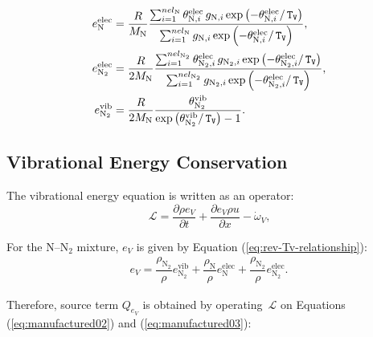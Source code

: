 \documentclass[10pt]{article}
\newcommand{\diff}[2] {\dfrac{\partial #1 }{\partial #2}}
\newcommand{\Lo}{\,\mathcal{L}}
\newcommand{\TV}{\,\mathtt{T_V}}
\newcommand{\N}{\text{N}}
\newcommand{\elec}{\text{elec}}
\newcommand{\vib}{\text{vib}}
\begin{document}
\begin{equation}
\begin{split}\label{eq:aux_02}
e_{\N}^{\elec} &=  \dfrac{R}{M_\N} \dfrac{\sum_{i=1}^{nel_{\N}}  \theta^{\elec}_{\N,i} \, g_{\N,i} \exp\left(- \theta^{\elec}_{\N,i}/ \TV \right)} { \sum_{i=1}^{nel_{\N}} g_{\N,i} \exp\left(-\theta^{\elec}_{\N,i}/\TV\right)},\vspace{5pt}	\\
%
e_{\N_2}^{\elec} &=\dfrac{R}{2 M_\N} \dfrac{\sum_{i=1}^{nel_{\N_2}}  \theta^{\elec}_{\N_2,i} \, g_{\N_2,i} \exp\left(- \theta^{\elec}_{\N_2,i} / \TV \right)} {\sum_{i=1}^{nel_{\N_2}} g_{\N_2,i} \exp\left(-\theta^{\elec}_{\N_2,i}/\TV\right)} \vspace{5pt},	\\
%
e_{\N_2}^{\vib} &= \dfrac{R}{2 M_\N} \frac{\theta^{\vib}_{\N_2}}{\exp\left(\theta^{\vib}_{\N_2}/ \TV \right) - 1} .
\end{split}
\end{equation}



\subsection{Vibrational Energy Conservation}
The vibrational energy equation is written as an operator:
\begin{equation*}
 \label{eq:euler1d_15}
\Lo =\diff{\rho e_V}{t}+\diff{e_V \rho u }{x} -\dot{\omega}_V,
\end{equation*}

 For the N--N$_2$ mixture, $e_V$ is given by Equation (\ref{eq:rev-Tv-relationship}):
\begin{equation*}
\begin{split}
e_V= \dfrac{\rho_{\N_2}}{\rho} e_{\N_2}^{\vib} + \dfrac{\rho_{\N}}{\rho} e_{\N}^{\elec} + \dfrac{\rho_{\N_2}}{\rho} e_{\N_2}^{\elec}.
\end{split}
\end{equation*}

Therefore, source term $Q_{e_V}$ is obtained by operating $\Lo$ on Equations (\ref{eq:manufactured02}) and (\ref{eq:manufactured03}):
%
\end{document}
